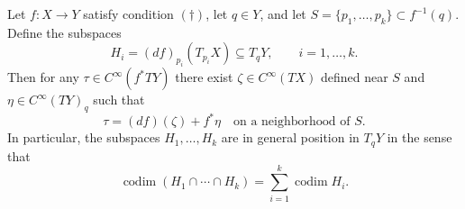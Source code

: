 %

\begin{lemma}
Let $f: X \to Y$ satisfy condition $(\dagger)$, let $q \in Y$, and let $S = \{p_1,\ldots,p_k\} \subset f^{-1}(q)$.
Define the subspaces
\[
H_i = (df)_{p_i}(T_{p_i}X) \subseteq T_qY, \qquad i = 1,\ldots,k.
\]
Then for any $\tau \in C^\infty(f^*TY)$ there exist $\zeta \in C^\infty(TX)$ defined near $S$ and $\eta \in C^\infty(TY)_q$ such that
\[
\tau = (df)(\zeta) + f^*\eta \quad \text{on a neighborhood of } S.
\]
In particular, the subspaces $H_1,\ldots,H_k$ are in general position in $T_qY$ in the sense that
\[
\operatorname{codim}(H_1 \cap \cdots \cap H_k) = \sum_{i=1}^{k} \operatorname{codim} H_i.
\]
\end{lemma}
